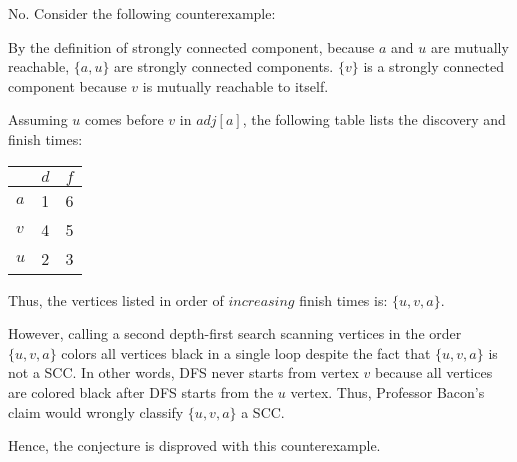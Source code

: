\documentclass[a4paper]{report}
\begin{document}
\begin{enumerate}
      No. Consider the following counterexample:


      By the definition of strongly connected component, because $a$ and $u$ are mutually reachable,
      $\{a,u\}$ are strongly connected components. $\{v\}$ is a strongly connected component because $v$
      is mutually reachable to itself. 

      Assuming $u$ comes before $v$ in $adj[a]$, the following table lists the discovery and finish times:

      \begin{center}
        \begin{tabular}{ l | c | r }
          \hline
            & $d$ & $f$ \\ \hline
          $a$ & 1 & 6 \\
          $v$ & 4 & 5 \\
          $u$ & 2 & 3 \\
          \hline  
        \end{tabular}
      \end{center}

      Thus, the vertices listed in order of $increasing$ finish times is: $\{u, v, a\}$.

      However, calling a second depth-first search scanning vertices in the order $\{u, v, a\}$ colors
      all vertices black in a single loop despite the fact that $\{u, v, a\}$ is not a SCC. 
      In other words, DFS never starts from vertex $v$ because all vertices are colored black after DFS starts from the $u$ vertex. 
      Thus, Professor Bacon's claim would wrongly classify $\{u, v, a\}$ a SCC.

      Hence, the conjecture is disproved with this counterexample.

    \par
    \bigskip


\end{enumerate}
\end{document}
